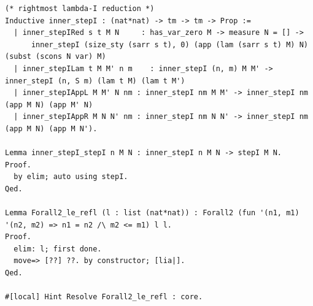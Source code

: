 \documentclass[10pt,a4paper]{article}
\begin{document}
\begin{lstlisting}[style=authorcoq]
(* rightmost lambda-I reduction *)
Inductive inner_stepI : (nat*nat) -> tm -> tm -> Prop :=
  | inner_stepIRed s t M N     : has_var_zero M -> measure N = [] ->
      inner_stepI (size_sty (sarr s t), 0) (app (lam (sarr s t) M) N) (subst (scons N var) M)
  | inner_stepILam t M M' n m    : inner_stepI (n, m) M M' -> inner_stepI (n, S m) (lam t M) (lam t M')
  | inner_stepIAppL M M' N nm : inner_stepI nm M M' -> inner_stepI nm (app M N) (app M' N)
  | inner_stepIAppR M N N' nm : inner_stepI nm N N' -> inner_stepI nm (app M N) (app M N').

Lemma inner_stepI_stepI n M N : inner_stepI n M N -> stepI M N.
Proof.
  by elim; auto using stepI.
Qed.

Lemma Forall2_le_refl (l : list (nat*nat)) : Forall2 (fun '(n1, m1) '(n2, m2) => n1 = n2 /\ m2 <= m1) l l.
Proof.
  elim: l; first done.
  move=> [??] ??. by constructor; [lia|].
Qed.

#[local] Hint Resolve Forall2_le_refl : core.


\end{lstlisting}
\end{document}
